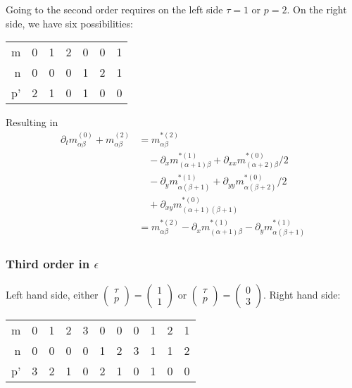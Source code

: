 Going to the second order requires on the left side $\tau=1$ or $p=2$.
On the right side, we have six possibilities:
\begin{center}
  \begin{tabular} {r || c | *{2}{c} | *{2}{c} | c}
    m  & 0 & 1 & 2 & 0 & 0 & 1 \\
    n  & 0 & 0 & 0 & 1 & 2 & 1 \\
    p' & 2 & 1 & 0 & 1 & 0 & 0
  \end{tabular}
\end{center}
Resulting in
\begin{equation}
  \label{eq:second order in epsilon}
  \begin{aligned}
    \partial_t m_{\alpha\beta}^{(0)} + m_{\alpha\beta}^{(2)}
    & =  m_{\alpha\beta}^{*(2)} \\
    &\quad - \partial_x m_{(\alpha+1)\beta}^{*(1)} + \partial_{xx} m_{(\alpha+2)\beta}^{*(0)}/2 \\
    &\quad - \partial_y m_{\alpha(\beta+1)}^{*(1)} + \partial_{yy} m_{\alpha(\beta+2)}^{*(0)}/2 \\
    &\quad + \partial_{xy} m_{(\alpha+1)(\beta+1)}^{*(0)}\\
    & =  m_{\alpha\beta}^{*(2)} - \partial_x m_{(\alpha+1)\beta}^{*(1)} - \partial_y m_{\alpha(\beta+1)}^{*(1)}
  \end{aligned}
\end{equation}


\subsubsection{Third order in \texorpdfstring{$\epsilon$}{epsilon}}
\label{subs:Third order in epsilon}

Left hand side, either $\begin{pmatrix}\tau \\ p\end{pmatrix} = \begin{pmatrix} 1 \\ 1 \end{pmatrix}$ or $\begin{pmatrix}\tau \\ p\end{pmatrix} = \begin{pmatrix} 0 \\ 3 \end{pmatrix}$.\newline
Right hand side:
\begin{center}
  \begin{tabular} {r || c | *{3}{c} | *{3}{c} | *{3}{c} }
    m  & 0 & 1 & 2 & 3 & 0 & 0 & 0 & 1 & 2 & 1 \\
    n  & 0 & 0 & 0 & 0 & 1 & 2 & 3 & 1 & 1 & 2 \\
    p' & 3 & 2 & 1 & 0 & 2 & 1 & 0 & 1 & 0 & 0
  \end{tabular}
\end{center}

